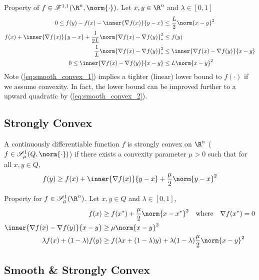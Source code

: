 \documentclass[../summary.tex]{subfiles}
\begin{document}
\noindent Property of $f\in \scrF^{1,1}(\R^n, \norm{\cdot})$. Let $x,y\in\R^n$ and $\lambda \in [0,1]$
\begin{align}
    0 
        \leq f(y) - f(x) - \inner{\nabla f(x)}{y-x}
        &\leq \frac{L}{2}\norm{x-y}^2 
        \label{eq:smooth_convex_1} \\
    f(x) + \inner{\nabla f(x)}{y-x} + \frac{1}{2L} \norm{\nabla f(x)- \nabla f(y)}^2_* 
        &\leq f(y) 
        \label{eq:smooth_convex_2} \\ 
    \frac{1}{L} \norm{\nabla f(x) - \nabla f(y)}_*^2
        &\leq \inner{\nabla f(x) - \nabla f(y)}{x-y} \\
    0 
        \leq \inner{\nabla f(x) - \nabla f(y)}{x-y}
        &\leq L \norm{x-y}^2
\end{align}
Note (\ref{eq:smooth_convex_1}) implies a tighter (linear) lower bound to $f(\cdot)$ if we assume convexity. In fact, the lower bound can be improved further to a upward quadratic by (\ref{eq:smooth_convex_2}).

\subsection{Strongly Convex}

\begin{definition}
    A continuously differentiable function $f$ is strongly convex on $\R^n$ ($f\in \scrS_{\mu}^1(Q,\norm{\cdot})$) if there exists a convexity parameter $\mu > 0$ such that for all $x,y\in Q$, 
    \begin{align}
        f(y)
            \geq f(x) + \inner{\nabla f(x)}{y-x} + \frac{\mu}{2}\norm{y-x}^2
    \end{align}
\end{definition}

\noindent Property for $f \in \scrS_{\mu}^1(\R^n)$. Let $x,y\in Q$ and $\lambda \in [0,1]$,
\begin{align}
    f(x)
        &\geq f(x^*) + \frac{\mu}{2} \norm{x-x^*}^2
        \quad\text{where}\quad
        \nabla f(x^*) = 0
            \label{eq:strongly_convex_1} \\
    \inner{\nabla f(x) - \nabla f(y)}{x-y}
        &\geq \mu \norm{x-y}^2 
            \label{eq:strongly_convex_bounded_residual}\\
    \lambda f(x) + (1-\lambda) f(y)
        &\geq f(\lambda x + (1-\lambda )y) + \lambda (1-\lambda )\frac{\mu}{2}\norm{x-y}^2
\end{align}

\subsection{Smooth \& Strongly Convex}
\end{document}
